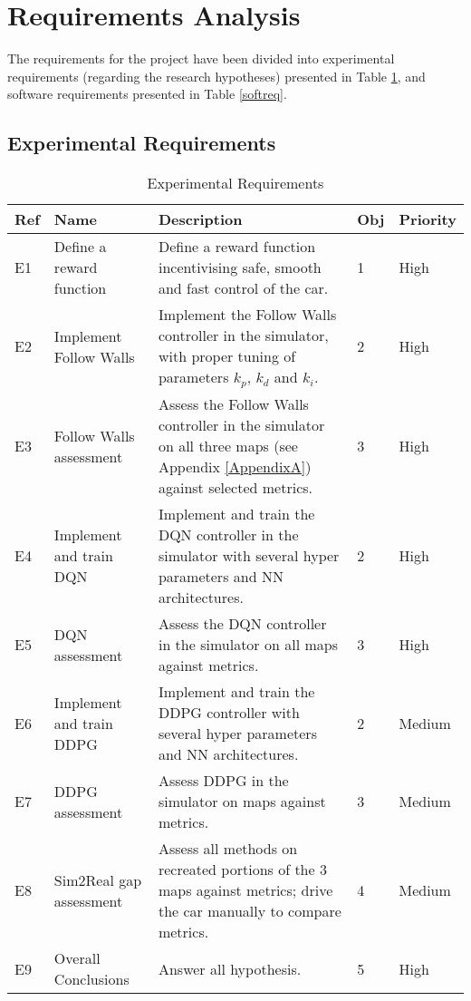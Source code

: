 \section{Requirements Analysis}
\label{reqana}
The requirements for the project have been divided into experimental requirements (regarding the research hypotheses) presented in Table \ref{expreqtab}, and software requirements presented in Table \ref{softreq}.
\subsection{Experimental Requirements}
\label{expreq}


\begin{table}[H]
\centering
\begin{tabularx}{\textwidth}{||l|l|X|l|l||} 
 \hline
 Ref & Name & Description & Obj & Priority\\ [0.5ex] 
 \hline\hline
 E1 & Define a reward function & Define a reward function incentivising safe, smooth and fast control of the car. & 1 & High \\
 \hline
 E2 & Implement Follow Walls & Implement the Follow Walls controller in the simulator, with proper tuning of parameters $k_p$, $k_d$ and $k_i$. & 2 & High \\
 \hline
 E3 & Follow Walls assessment & Assess the Follow Walls controller in the simulator on all three maps (see Appendix \ref{AppendixA}) against selected metrics. & 3 & High \\
 \hline
 E4 & Implement and train DQN & Implement and train the DQN controller in the simulator with several hyper parameters and NN architectures. & 2 & High \\
 \hline
 E5 & DQN assessment & Assess the DQN controller in the simulator on all maps against metrics. & 3 & High \\ [1ex]
  \hline
 E6 & Implement and train DDPG & Implement and train the DDPG controller with several hyper parameters and NN architectures. & 2 & Medium \\
  \hline
 E7 & DDPG assessment & Assess DDPG in the simulator on maps against metrics. & 3 & Medium \\ 
 \hline
 E8 & Sim2Real gap assessment & Assess all methods on recreated portions of the 3 maps against metrics; drive the car manually to compare metrics. & 4 & Medium \\
  \hline
 E9 & Overall Conclusions & Answer all hypothesis. & 5 & High \\ [1ex]
  \hline
\end{tabularx}
\caption{Experimental Requirements}
\label{expreqtab}
\end{table}


